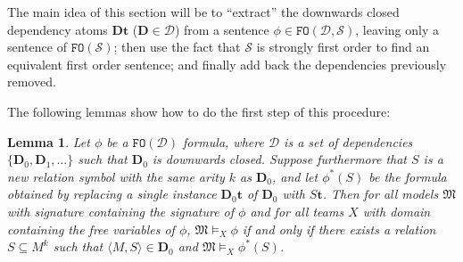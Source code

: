 \documentclass{article}
\newtheorem{Lemma}[Theorem]{Lemma}
\theoremstyle{definition}
\newcommand{\tuple}{\mathbf}
\newcommand{\FO}{\texttt{FO}}
\newcommand{\M}{\mathfrak M}
\newcommand{\D}{\mathbf D}
\newcommand{\DD}{\mathcal D}
\newcommand{\SSd}{\mathcal S}
\begin{document}
The main idea of this section will be to ``extract'' the downwards closed dependency atoms $\D \tuple t$ ($\D \in \DD$) from a sentence $\phi \in \FO(\DD, \SSd)$, leaving only a sentence of $\FO(\SSd)$; then use the fact that $\SSd$ is strongly first order to find an equivalent first order sentence; and finally add back the dependencies previously removed. 

The following lemmas show how to do the first step of this procedure: 
\begin{Lemma}
	Let $\phi$ be a $\FO(\DD)$ formula, where $\DD$ is a set of dependencies $\{\D_0, \D_1, \ldots\}$ such that $\D_0$ is downwards closed. Suppose furthermore that $S$ is a new relation symbol with the same arity $k$ as $\D_0$, and let $\phi^*(S)$ be the formula obtained by replacing a \emph{single} instance $\D_0 \tuple t$ of $\D_0$ with $S \tuple t$. Then for all models $\M$ with signature containing the signature of $\phi$ and for all teams $X$ with domain containing the free variables of $\phi$, $\M \models_X \phi$ if and only if there exists a relation $S \subseteq M^{k}$ such that $\langle M, S\rangle \in \D_0$ and  $\M \models_X \phi^*(S)$.
\end{Lemma}
\end{document}
